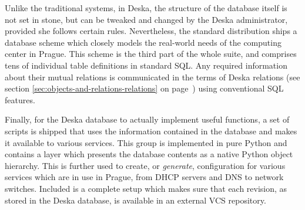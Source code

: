 \documentclass[deska]{subfiles}
\begin{document}
Unlike the traditional systems, in Deska, the structure of the database itself is not set in stone, but can be tweaked
and changed by the Deska administrator, provided she follows certain rules.  Nevertheless, the standard distribution
ships a database scheme which closely models the real-world needs of the computing center in Prague.  This scheme is the
third part of the whole suite, and comprises tens of individual table definitions in standard SQL.  Any required
information about their mutual relations is communicated in the terms of Deska relations (see section
\ref{sec:objects-and-relations-relations} on page~\pageref{sec:objects-and-relations-relations}) using conventional SQL
features.

Finally, for the Deska database to actually implement useful functions, a set of scripts is shipped that uses the
information contained in the database and makes it available to various services.  This group is implemented in pure
Python and contains a layer which presents the database contents as a native Python object hierarchy.  This is further
used to create, or {\em generate}, configuration for various services which are in use in Prague, from DHCP servers and
DNS to network switches.  Included is a complete setup which makes sure that each revision, as stored in the Deska
database, is available in an external VCS repository.
\end{document}

